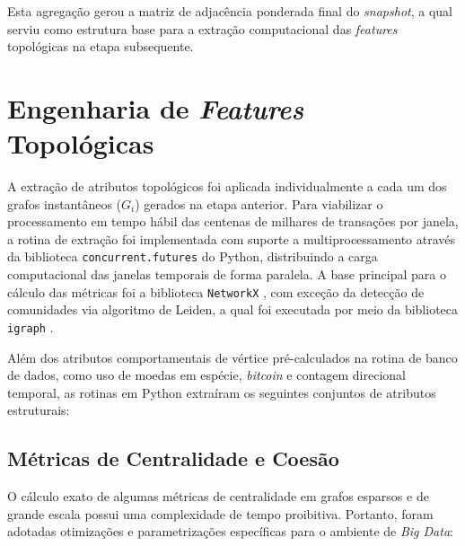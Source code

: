 \documentclass[a4paper,12pt,oneside,onecolumn,final,fleqn]{repUERJ}
\begin{document}
Esta agregação gerou a matriz de adjacência ponderada final do \textit{snapshot}, a qual serviu como estrutura base para a extração computacional das \textit{features} topológicas na etapa subsequente.

\section{Engenharia de \textit{Features} Topológicas}

A extração de atributos topológicos foi aplicada individualmente a cada um dos grafos instantâneos ($G_i$) gerados na etapa anterior. Para viabilizar o processamento em tempo hábil das centenas de milhares de transações por janela, a rotina de extração foi implementada com suporte a multiprocessamento através da biblioteca \texttt{concurrent.futures} do Python, distribuindo a carga computacional das janelas temporais de forma paralela. A base principal para o cálculo das métricas foi a biblioteca \texttt{NetworkX} \cite{hagberg2008exploring}, com exceção da detecção de comunidades via algoritmo de Leiden, a qual foi executada por meio da biblioteca \texttt{igraph} \cite{traag2019leiden}.

Além dos atributos comportamentais de vértice pré-calculados na rotina de banco de dados, como uso de moedas em espécie, \textit{bitcoin} e contagem direcional temporal, as rotinas em Python extraíram os seguintes conjuntos de atributos estruturais:

\subsection{Métricas de Centralidade e Coesão}

O cálculo exato de algumas métricas de centralidade em grafos esparsos e de grande escala possui uma complexidade de tempo proibitiva. Portanto, foram adotadas otimizações e parametrizações específicas para o ambiente de \textit{Big Data}:
\end{document}
